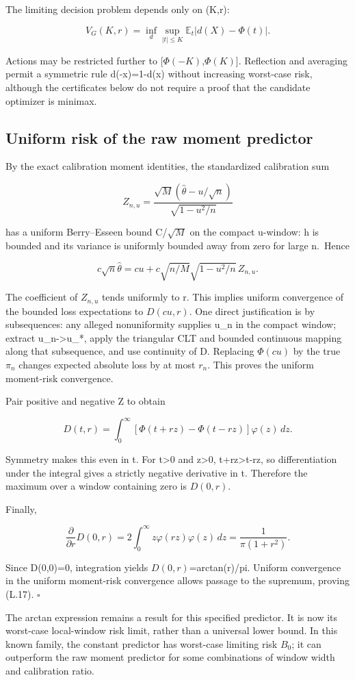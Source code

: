 The limiting decision problem depends only on (K,r):

\[
V_G(K,r)=\inf_d\sup_{|t|\le K}\mathbb E_t|d(X)-\Phi(t)|.
\tag{G.7}
\]

Actions may be restricted further to {[}\(\Phi(-K)\),\(\Phi(K)\){]}. Reflection and averaging permit a symmetric rule d(-x)=1-d(x) without increasing worst-case risk, although the certificates below do not require a proof that the candidate optimizer is minimax.

\subsection{Uniform risk of the raw moment predictor}\label{uniform-risk-of-the-raw-moment-predictor}

By the exact calibration moment identities, the standardized calibration sum

\[
Z_{n,u}=\frac{\sqrt M(\widehat\theta-u/\sqrt n)}
 {\sqrt{1-u^2/n}}
\]

has a uniform Berry--Esseen bound C/\(\sqrt M\) on the compact u-window: h is bounded and its variance is uniformly bounded away from zero for large n.~Hence

\[
c\sqrt n\widehat\theta
=cu+c\sqrt{n/M}\sqrt{1-u^2/n}\,Z_{n,u}.
\]

The coefficient of \(Z_{n,u}\) tends uniformly to r. This implies uniform convergence of the bounded loss expectations to \(D(cu,r)\). One direct justification is by subsequences: any alleged nonuniformity supplies u\_n in the compact window; extract u\_n-\textgreater u\_*, apply the triangular CLT and bounded continuous mapping along that subsequence, and use continuity of D. Replacing \(\Phi(cu)\) by the true \(\pi_n\) changes expected absolute loss by at most \(r_n\). This proves the uniform moment-risk convergence.

Pair positive and negative Z to obtain

\[
D(t,r)=\int_0^\infty
 [\Phi(t+rz)-\Phi(t-rz)]\varphi(z)\,dz.
\tag{L.18}
\]

Symmetry makes this even in t. For t\textgreater0 and z\textgreater0,
\textbar t+rz\textbar\textgreater\textbar t-rz\textbar, so differentiation under the integral gives a strictly negative derivative in t. Therefore the maximum over a window containing zero is \(D(0,r)\).

Finally,

\[
\frac{\partial}{\partial r}D(0,r)
=2\int_0^\infty z\varphi(rz)\varphi(z)\,dz
=\frac1{\pi(1+r^2)}.
\]

Since D(0,0)=0, integration yields \(D(0,r)\)=arctan(r)/pi. Uniform convergence in the uniform moment-risk convergence allows passage to the supremum, proving (L.17). \(\square\)

The arctan expression remains a result for this specified predictor. It is now its worst-case local-window risk limit, rather than a universal lower bound. In this known family, the constant predictor has worst-case limiting risk \(B_0\); it can outperform the raw moment predictor for some combinations of window width and calibration ratio.
